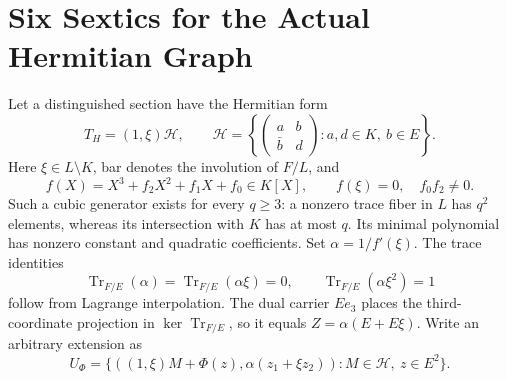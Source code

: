 \documentclass[12pt,letterpaper,onecolumn]{article}
\theoremstyle{definition}
\theoremstyle{remark}
\DeclareMathOperator{\Tr}{Tr}
\begin{document}
\section{Six Sextics for the Actual Hermitian Graph}
Let a distinguished section have the Hermitian form
\[
T_H=(1,\xi)\mathcal H,\qquad
\mathcal H=\left\{\begin{pmatrix}a&b\\\bar b&d\end{pmatrix}:a,d\in K,\ b\in E\right\}.
\]
Here \(\xi\in L\setminus K\), bar denotes the involution of \(F/L\), and
\[
f(X)=X^3+f_2X^2+f_1X+f_0\in K[X],\qquad
f(\xi)=0,\quad f_0f_2\ne0.
\]
Such a cubic generator exists for every \(q\ge3\): a nonzero trace fiber in \(L\) has \(q^2\) elements, whereas its intersection with \(K\) has at most \(q\). Its minimal polynomial has nonzero constant and quadratic coefficients.
Set \(\alpha=1/f'(\xi)\). The trace identities
\[
\Tr_{F/E}(\alpha)=\Tr_{F/E}(\alpha\xi)=0,
\qquad \Tr_{F/E}(\alpha\xi^2)=1
\]
follow from Lagrange interpolation. The dual carrier \(Ee_3\) places the third-coordinate projection in \(\ker\Tr_{F/E}\), so it equals
\(Z=\alpha(E+E\xi)\).
Write an arbitrary extension as
\[
U_\Phi=\{((1,\xi)M+\Phi(z),\alpha(z_1+\xi z_2)):
M\in\mathcal H,\ z\in E^2\}.
\]
\end{document}

